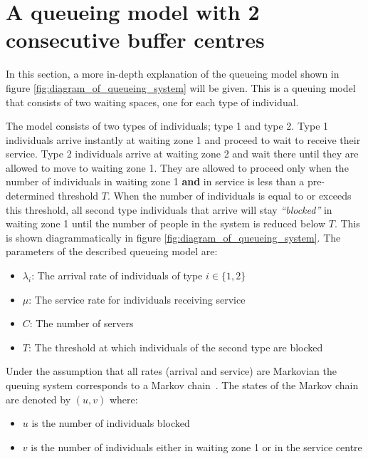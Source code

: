 \section{A queueing model with 2 consecutive buffer centres}\label{sec:queueing_model}
In this section, a more in-depth explanation of the queueing model shown in 
figure \ref{fig:diagram_of_queueing_system} will be given.
This is a queuing model that consists of two waiting spaces, one for each type
of individual.

The model consists of two types of individuals; type 1 and type 2.
Type 1 individuals arrive instantly at waiting zone 1 and proceed to wait to
receive their service. 
Type 2 individuals arrive at waiting zone 2 and wait there until they are 
allowed to move to waiting zone 1. 
They are allowed to proceed only when the number of 
individuals in waiting zone 1 \textbf{and} in service is less than a 
pre-determined threshold \(T\).
When the number of individuals is equal to or exceeds this threshold, all 
second type individuals that arrive will stay 
\textit{``blocked''} in waiting zone 1 until the number of people in the 
system is reduced below \(T\). 
This is shown diagrammatically in figure \ref{fig:diagram_of_queueing_system}.
The parameters of the described queueing model are:

\begin{itemize}
    \item \(\lambda_i\): The arrival rate of individuals of type \(i\in\{1, 2\}\)
    \item \(\mu\): The service rate for individuals receiving service
    \item \(C\): The number of servers
    \item \(T\): The threshold at which individuals of the second type are blocked
\end{itemize}

Under the assumption that all rates (arrival and service) are Markovian the
queuing system corresponds to a Markov chain~\cite{kemeny1976markov}.
The states of the Markov chain are denoted by \((u,v)\) where:

\begin{itemize}
    \item \(u\) is the number of individuals blocked
    \item \(v\) is the number of individuals either in waiting zone 1 or in the
    service centre
\end{itemize}

